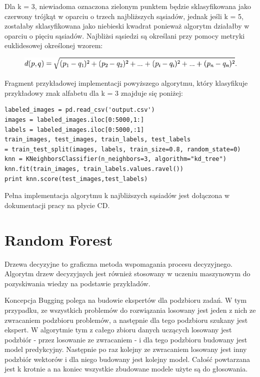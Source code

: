 \documentclass[brudnopis]{xmgr}
\begin{document}
Dla k = 3, niewiadoma oznaczona zielonym punktem będzie sklasyfikowana jako czerwony trójkąt w oparciu o trzech najbliższych sąsiadów, jednak jeśli k = 5, zostałaby sklasyfikowana jako niebieski kwadrat ponieważ algorytm działałby w oparciu o pięciu sąsiadów. Najbliżsi sąsiedzi są określani przy pomocy metryki euklidesowej określonej wzorem:

\begin{figure}[!tbh]
\centering
\includegraphics[width=1\hsize]{fig/knn-wzor}
\end{figure}

Fragment przykładowej implementacji powyższego algorytmu, który klasyfikuje przykładowy znak alfabetu dla k = 3 znajduje się poniżej:

\begin{verbatim}
labeled_images = pd.read_csv('output.csv')
images = labeled_images.iloc[0:5000,1:]
labels = labeled_images.iloc[0:5000,:1]
train_images, test_images, train_labels, test_labels 
= train_test_split(images, labels, train_size=0.8, random_state=0)
knn = KNeighborsClassifier(n_neighbors=3, algorithm="kd_tree")
knn.fit(train_images, train_labels.values.ravel())
print knn.score(test_images,test_labels)
\end{verbatim}

Pełna implementacja algorytmu k najbliższych sąsiadów jest dołączona w dokumentacji pracy na płycie CD.

\section{Random Forest}
Drzewa decyzyjne to graficzna metoda wspomagania procesu decyzyjnego. Algorytm drzew decyzyjnych jest również stosowany w uczeniu maszynowym do pozyskiwania wiedzy na podstawie przykładów.
\newpage

Koncepcja Bugging polega na budowie ekspertów dla podzbioru zadań. W tym przypadku, ze wszystkich problemów do rozwiązania losowany jest jeden z nich ze zwracaniem podzbioru problemów, a następnie dla tego podzbioru szukany jest ekspert. W algorytmie tym z całego zbioru danych uczących losowany jest podzbiór - przez losowanie ze zwracaniem - i dla tego podzbioru budowany jest model predykcyjny. Następnie po raz kolejny ze zwracaniem losowany jest inny podzbiór wektorów i dla niego budowany jest kolejny model. Całość powtarzana jest k krotnie a na koniec wszystkie zbudowane modele użyte są do głosowania.
\end{document}
